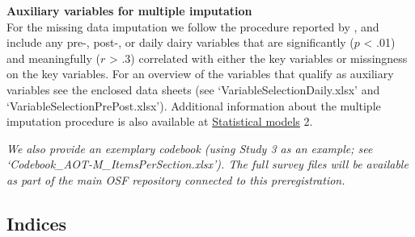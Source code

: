 \documentclass[]{article}
\begin{document}
\textbf{Auxiliary variables for multiple imputation}\\
For the missing data imputation we follow the procedure reported by
\citet{Monden2015}, and include any pre-, post-, or daily dairy
variables that are significantly (\(p\) \textless{} .01) and
meaningfully (\(r\) \textgreater{} .3) correlated with either the key
variables or missingness on the key variables. For an overview of the
variables that qualify as auxiliary variables see the enclosed data
sheets (see `VariableSelectionDaily.xlsx' and
`VariableSelectionPrePost.xlsx'). Additional information about the
multiple imputation procedure is also available at
\protect\hyperlink{statistical-models}{Statistical models} 2.

\emph{We also provide an exemplary codebook (using Study 3 as an
example; see `Codebook\_AOT-M\_ItemsPerSection.xlsx'). The full survey
files will be available as part of the main OSF repository connected to
this preregistration.}

\hypertarget{indices}{%
\subsection{Indices}\label{indices}}
\end{document}
